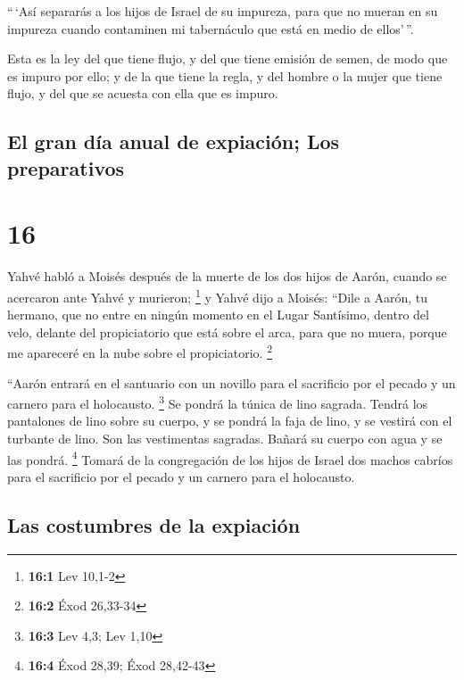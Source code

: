  ``\,`Así separarás a los hijos de Israel de su impureza,
para que no mueran en su impureza cuando contaminen mi tabernáculo que
está en medio de ellos'\,''.

 Esta es la ley del que tiene flujo, y del que tiene
emisión de semen, de modo que es impuro por ello;  y de
la que tiene la regla, y del hombre o la mujer que tiene flujo, y del
que se acuesta con ella que es impuro.

\hypertarget{el-gran-duxeda-anual-de-expiaciuxf3n-los-preparativos}{%
\subsection{El gran día anual de expiación; Los
preparativos}\label{el-gran-duxeda-anual-de-expiaciuxf3n-los-preparativos}}

\hypertarget{section-15}{%
\section{16}\label{section-15}}

 Yahvé habló a Moisés después de la muerte de los dos
hijos de Aarón, cuando se acercaron ante Yahvé y murieron; \footnote{\textbf{16:1}
  Lev 10,1-2}  y Yahvé dijo a Moisés: ``Dile a Aarón, tu
hermano, que no entre en ningún momento en el Lugar Santísimo, dentro
del velo, delante del propiciatorio que está sobre el arca, para que no
muera, porque me apareceré en la nube sobre el propiciatorio.
\footnote{\textbf{16:2} Éxod 26,33-34}

 ``Aarón entrará en el santuario con un novillo para el
sacrificio por el pecado y un carnero para el holocausto. \footnote{\textbf{16:3}
  Lev 4,3; Lev 1,10}  Se pondrá la túnica de lino sagrada.
Tendrá los pantalones de lino sobre su cuerpo, y se pondrá la faja de
lino, y se vestirá con el turbante de lino. Son las vestimentas
sagradas. Bañará su cuerpo con agua y se las pondrá. \footnote{\textbf{16:4}
  Éxod 28,39; Éxod 28,42-43}  Tomará de la congregación de
los hijos de Israel dos machos cabríos para el sacrificio por el pecado
y un carnero para el holocausto.

\hypertarget{las-costumbres-de-la-expiaciuxf3n}{%
\subsection{Las costumbres de la
expiación}\label{las-costumbres-de-la-expiaciuxf3n}}

